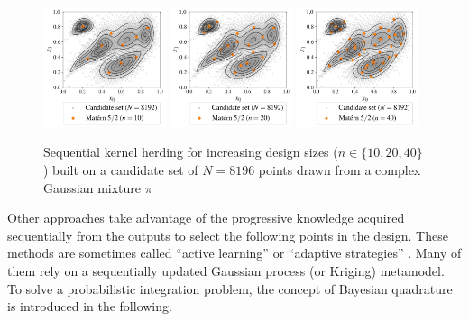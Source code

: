 \begin{figure}[!h]
\begin{center}
    \includegraphics[width=0.32\textwidth]{part2/figures/DCE/numerical_experiments/gaussian_mixture_sampling10.jpg}
    \includegraphics[width=0.32\textwidth]{part2/figures/DCE/numerical_experiments/gaussian_mixture_sampling20.jpg}
    \includegraphics[width=0.32\textwidth]{part2/figures/DCE/numerical_experiments/gaussian_mixture_sampling40.jpg}
\end{center}
\caption{Sequential kernel herding for increasing design sizes ($n\in\{10, 20, 40\}$) built on a candidate set of $N=8196$ points drawn from a complex Gaussian mixture $\pi$} \label{fig:KH_mixture}
\end{figure}

Other approaches take advantage of the progressive knowledge acquired sequentially from the outputs to select the following points in the design. 
These methods are sometimes called ``active learning'' or ``adaptive strategies'' \citep{fau_2021}. 
Many of them rely on a sequentially updated Gaussian process (or Kriging) metamodel. 
To solve a probabilistic integration problem, the concept of Bayesian quadrature is introduced in the following. 

